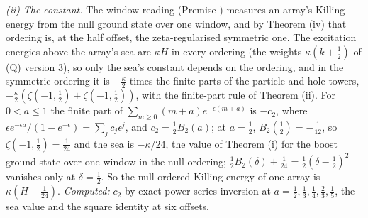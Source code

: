 \emph{(ii)} \emph{The constant.} The window reading (Premise ) measures an array's Killing energy from the null ground state over one window, and by Theorem (iv) that ordering is, at the half offset, the zeta-regularised symmetric one. The excitation energies above the array's sea are $\kappa H$ in every ordering (the weights $\kappa(k + \tfrac12)$ of (Q) version 3), so only the sea's constant depends on the ordering, and in the symmetric ordering it is $-\tfrac{\kappa}{2}$ times the finite parts of the particle and hole towers, $-\tfrac{\kappa}{2}(\zeta(-1, \tfrac12) + \zeta(-1, \tfrac12))$, with the finite-part rule of Theorem (ii). For $0 < a \le 1$ the finite part of $\sum_{m \ge 0}(m + a)e^{-\epsilon(m + a)}$ is $-c_{2}$, where $\epsilon e^{-\epsilon a}/(1 - e^{-\epsilon}) = \sum_{j}c_{j}\epsilon^{j}$, and $c_{2} = \tfrac12B_{2}(a)$; at $a = \tfrac12$, $B_{2}(\tfrac12) = -\tfrac1{12}$, so $\zeta(-1, \tfrac12) = \tfrac1{24}$ and the sea is $-\kappa/24$, the value of Theorem (i) for the boost ground state over one window in the null ordering; $\tfrac12B_{2}(\delta) + \tfrac1{24} = \tfrac12(\delta - \tfrac12)^{2}$ vanishes only at $\delta = \tfrac12$. So the null-ordered Killing energy of one array is $\kappa(H - \tfrac1{24})$. \emph{Computed:} $c_{2}$ by exact power-series inversion at $a = \tfrac12, \tfrac13, \tfrac14, \tfrac23, \tfrac15$, the sea value and the square identity at six offsets.

